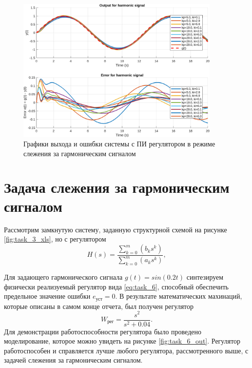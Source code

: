 \begin{figure}[H]
    \centering
    \includegraphics[width=0.9\textwidth]{figs/task_5_out_harmonic.png}
    \caption{Графики выхода и ошибки системы с ПИ регулятором в режиме слежения за гармоническим сигналом}
    \label{fig:task_5_out_harmonic}
\end{figure}




\section{Задача слежения за гармоническим сигналом}

Рассмотрим замкнутую систему, заданную структурной схемой на рисунке \ref{fig:task_3_xls},
но с регулятором
\begin{equation}
    H(s)=\frac{\sum_{k=0}^m(b_ks^k)}{\sum_{k=0}^m(a_ks^k)},
    \label{eq:task_6}
\end{equation}

Для задающего гармонического сигнала $g(t) = sin(0.2t)$ синтезируем
физически реализуемый регулятор вида \ref{eq:task_6}, способный обеспечить предельное значение 
ошибки $e_\text{уст} = 0$. В результате математических махинаций, которые описаны в самом
конце отчета, был получен регулятор
\begin{equation*}
    W_\text{рег}=\frac{s^2}{s^2+0.04}.
\end{equation*}
Для демонстрации работоспособности регулятора было проведено моделирование, которое
можно увидеть на рисунке \ref{fig:task_6_out}. Регулятор работоспособен и справляется
лучше любого регулятора, рассмотренного выше, с задачей слежения за гармоническим
сигналом.

